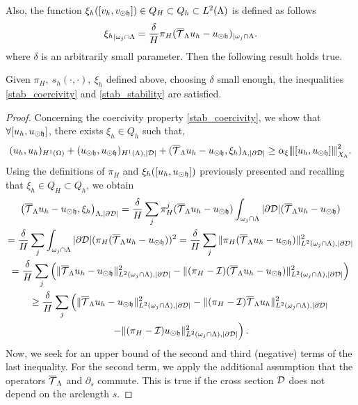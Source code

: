 \documentclass[r]{siamart171218}
\begin{document}
Also, the function $\xi_h([v_h, v_{\odot \mathfrak{h}}]) \in Q_H \subset Q_h \subset L^2(\Lambda)$ is defined as follows
\begin{equation*}
{\xi_h}_{|\omega _j\cap \Lambda}=\frac{\delta}{H} \pi_H({\overline{\mathcal{T}}_\Lambda} u_h-u_{\odot \mathfrak{h}})_{|\omega _j \cap \Lambda}.
\end{equation*}
where $\delta$ is an arbitrarily small parameter. Then the following result holds true. 
\begin{lemma}
Given $\pi_H,\ s_h(\cdot,\cdot), \ \xi_h$ defined above, 
choosing $\delta$ small enough,
the inequalities \eqref{stab_coercivity} and \eqref{stab_stability} are satisfied.
\end{lemma}
\begin{proof} 
Concerning the coercivity property \eqref{stab_coercivity}, we show that $\forall [u_h, u_{\odot \mathfrak{h}}]$, there exists $\xi_h \in Q_h$ such that,
\begin{equation*}
(u_h,u_h)_{H^1(\Omega)}+ (u_{\odot \mathfrak{h}}, u_{\odot \mathfrak{h}})_{H^1(\Lambda), |\mathcal{D}|} +   ({\overline{\mathcal{T}}_\Lambda} u_h - u_{\odot \mathfrak{h}}, \xi_h)_{\Lambda,|\partial\mathcal{D}|} \geq \alpha_{\xi}{\left\vert\kern-0.25ex\left\vert\kern-0.25ex\left\vert [u_h, u_{\odot \mathfrak{h}}] \right\vert\kern-0.25ex\right\vert\kern-0.25ex\right\vert}^2_{X_h}.
\end{equation*}
Using the definitions of $\pi_H$ and $\xi_h([u_h, u_{\odot \mathfrak{h}}])$ previously presented and recalling that $\xi_h\in Q_H \subset Q_h$, we obtain
\begin{multline*}
\left( {\overline{\mathcal{T}}_\Lambda} u_h - u_{\odot \mathfrak{h}}, \xi _h \right)_{\Lambda,|\partial\mathcal{D}|} 
= \frac{\delta}{H}\sum_j \pi_H^j( {\overline{\mathcal{T}}_\Lambda} u_h - u_{\odot \mathfrak{h}})\int_{\omega _j\cap \Lambda} |\partial\mathcal{D}|({\overline{\mathcal{T}}_\Lambda} u_h - u_{\odot \mathfrak{h}})
\\
= \frac{\delta}{H} \sum_j \int_{\omega _j\cap \Lambda}|\partial\mathcal{D}| (\pi_H( {\overline{\mathcal{T}}_\Lambda} u_h - u_{\odot \mathfrak{h}}) )^2
= \frac{\delta}{H}\sum_j \|\pi_H( {\overline{\mathcal{T}}_\Lambda} u_h - u_{\odot \mathfrak{h}})\|_{L^2(\omega _j\cap \Lambda),|\partial\mathcal{D}|}^2
\\
= \frac{\delta}{H} \sum_j \left( \|{\overline{\mathcal{T}}_\Lambda} u_h - u_{\odot \mathfrak{h}}\|^2_{L^2(\omega _j\cap \Lambda),|\partial\mathcal{D}|} - \|(\pi_H-\mathcal{I})({\overline{\mathcal{T}}_\Lambda} u_h - u_{\odot \mathfrak{h}})\|^2_{L^2(\omega _j\cap \Lambda),|\partial\mathcal{D}|} \right) 
\\ 
\geq \frac{\delta}{H} \sum_j \left(
\|{\overline{\mathcal{T}}_\Lambda} u_h-u_{\odot \mathfrak{h}}\|^2_{L^2(\omega _j\cap \Lambda),|\partial\mathcal{D}|}
- \|(\pi_H - \mathcal{I}){\overline{\mathcal{T}}_\Lambda} u_h\|^2_{L^2(\omega _j\cap \Lambda), |\partial\mathcal{D}|} \right.
\\
\left.- \|(\pi_H - \mathcal{I})u_{\odot \mathfrak{h}}\|^2_{L^2(\omega _j\cap \Lambda),|\partial\mathcal{D}|} \right). 
\end{multline*}
Now, we seek for an upper bound of the second and third (negative) terms of the last inequality.
For the second term, we apply the additional assumption that the operators ${\overline{\mathcal{T}}_\Lambda}$ and $\partial_s$ commute. This is true if the cross section $\mathcal{D}$ does not depend on the arclength $s$.

\end{proof}
\end{document}
